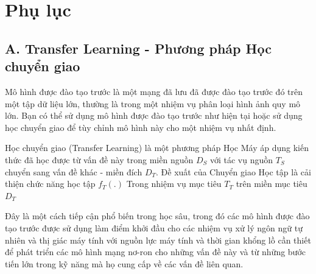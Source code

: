 \documentclass{article}
\begin{document}
	\section{Phụ lục}
	
	\subsection{A. Transfer Learning - Phương pháp Học chuyển giao}
	Mô hình được đào tạo trước là một mạng đã lưu đã được đào tạo trước đó trên một tập dữ liệu lớn, thường là trong một nhiệm vụ phân loại hình ảnh quy mô lớn. Bạn có thể sử dụng mô hình được đào tạo trước như hiện tại hoặc sử dụng học chuyển giao để tùy chỉnh mô hình này cho một nhiệm vụ nhất định.
	
	Học chuyển giao (Transfer Learning) là một phương pháp Học Máy áp dụng kiến thức đã học được từ vấn đề này trong miền nguồn $ D_{S} $ với tác vụ nguồn $ T_{S}$ chuyển sang vấn đề khác - miền đích $ D_{T} $. Đề xuất của Chuyển giao Học tập là cải thiện chức năng học tập $f_{T}(.)$ Trong nhiệm vụ mục tiêu $ T_{T} $ trên miền mục tiêu $D_{T}$
	
	Đây là một cách tiếp cận phổ biến trong học sâu, trong đó các mô hình được đào tạo trước được sử dụng làm điểm khởi đầu cho các nhiệm vụ xử lý ngôn ngữ tự nhiên và thị giác máy tính với nguồn lực máy tính và thời gian khổng lồ cần thiết để phát triển các mô hình mạng nơ-ron cho những vấn đề này và từ những bước tiến lớn trong kỹ năng mà họ cung cấp về các vấn đề liên quan.
	
\end{document}
